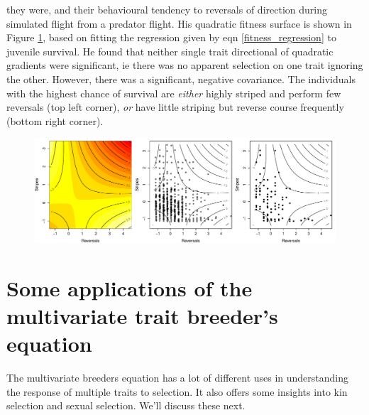 they were, and their behavioural tendency to reversals of direction
during simulated flight from a predator flight. His quadratic fitness surface is shown in Figure
\ref{fig:Garter_snakes_Brodie}, based on fitting the
regression given by eqn \eqref{fitness_regression} to juvenile
survival. He found that neither single trait directional of quadratic
gradients were significant, ie there was no apparent selection on one 
trait ignoring the other. However, there was a significant, negative
covariance. The individuals with the highest chance of survival are
{\it either} highly striped and perform few reversals (top left
corner), {\it or} have little striping but reverse course frequently
(bottom right corner). 

\begin{figure}
\begin{center} 
\includegraphics[width= \textwidth]{Journal_figs/Quant_gen/Garter_snakes_Brodie/Garter_snakes_Brodie.pdf}
\end{center}
\caption{  } \label{fig:Garter_snakes_Brodie}
\end{figure} 




\section{Some applications of the multivariate trait breeder's equation}

The multivariate breeders equation has a lot of different uses in understanding the response of multiple traits to selection. It also offers some insights into kin selection and sexual selection. We'll discuss these next.

